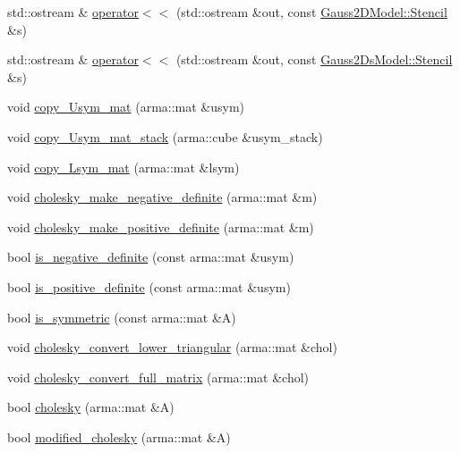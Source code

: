 \begin{DoxyCompactItemize}
\item 
std\+::ostream \& \hyperlink{namespacemappel_a26f5292b0b83c1b95c1d6c0a5d3a15ae}{operator$<$$<$} (std\+::ostream \&out, const \hyperlink{classmappel_1_1Gauss2DModel_1_1Stencil}{Gauss2\+D\+Model\+::\+Stencil} \&s)
\item 
std\+::ostream \& \hyperlink{namespacemappel_a90e45f1983acf5114399c7ef0918b125}{operator$<$$<$} (std\+::ostream \&out, const \hyperlink{classmappel_1_1Gauss2DsModel_1_1Stencil}{Gauss2\+Ds\+Model\+::\+Stencil} \&s)
\item 
void \hyperlink{namespacemappel_a7332bb151bb9ea23be4af80743009954}{copy\+\_\+\+Usym\+\_\+mat} (arma\+::mat \&usym)
\item 
void \hyperlink{namespacemappel_adc3bf0a587ba342027b52ba7075e72cc}{copy\+\_\+\+Usym\+\_\+mat\+\_\+stack} (arma\+::cube \&usym\+\_\+stack)
\item 
void \hyperlink{namespacemappel_a32086cdd1ef53eaff6ed9449d9fd8c1a}{copy\+\_\+\+Lsym\+\_\+mat} (arma\+::mat \&lsym)
\item 
void \hyperlink{namespacemappel_af0d85d0ac01f8397a555efb5912fc2ea}{cholesky\+\_\+make\+\_\+negative\+\_\+definite} (arma\+::mat \&m)
\item 
void \hyperlink{namespacemappel_af22fb1e606ca14f8b46ffde3b8833a9f}{cholesky\+\_\+make\+\_\+positive\+\_\+definite} (arma\+::mat \&m)
\item 
bool \hyperlink{namespacemappel_ad631839d6d2c62198d21364ca379f529}{is\+\_\+negative\+\_\+definite} (const arma\+::mat \&usym)
\item 
bool \hyperlink{namespacemappel_a3ffbe5273f0e95ef18a3bc26bc207489}{is\+\_\+positive\+\_\+definite} (const arma\+::mat \&usym)
\item 
bool \hyperlink{namespacemappel_ac4b4d6a93b8b227b0a845693ba842e61}{is\+\_\+symmetric} (const arma\+::mat \&A)
\item 
void \hyperlink{namespacemappel_ab5ab3a874402fccd700e6c7afbbd3e15}{cholesky\+\_\+convert\+\_\+lower\+\_\+triangular} (arma\+::mat \&chol)
\item 
void \hyperlink{namespacemappel_a2f4256e721d1f22f2d72817ba3d2540d}{cholesky\+\_\+convert\+\_\+full\+\_\+matrix} (arma\+::mat \&chol)
\item 
bool \hyperlink{namespacemappel_abc3956f093388acda04ee4455d01b515}{cholesky} (arma\+::mat \&A)
\item 
bool \hyperlink{namespacemappel_a5b0ad6d46ef0173ae9e44a0ff9af7f0b}{modified\+\_\+cholesky} (arma\+::mat \&A)
\item 

\end{DoxyCompactItemize}
